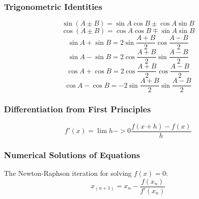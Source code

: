 \documentclass{book}
\begin{document}
            \subsubsection{Trigonometric Identities}
                \begin{equation} \label{sine_compound_angle_formula}
                    \sin(A\pm B)=\sin A\cos B\pm\cos A\sin B
                \end{equation}
                \begin{equation} \label{cosine_compound_angle_formula}
                    \cos(A\pm B)=\cos A\cos B\mp\sin A\sin B
                \end{equation}
                \begin{equation} \label{sine_addition_formula}
                    \sin A+\sin B=2\sin{\frac{A+B}{2}}\cos{\frac{A-B}{2}}
                \end{equation}
                \begin{equation} \label{sine_subtraction_formula}
                    \sin A-\sin B=2\cos{\frac{A+B}{2}}\sin{\frac{A-B}{2}}
                \end{equation}
                \begin{equation} \label{cosine_addition_formula}
                    \cos A+\cos B=2\cos{\frac{A+B}{2}}\cos{\frac{A-B}{2}}
                \end{equation}
                \begin{equation} \label{cosine_subtraction_formula}
                    \cos A-\cos B=-2\sin{\frac{A+B}{2}}\sin{\frac{A-B}{2}}
                \end{equation}

            \subsubsection{Differentiation from First Principles}
                \begin{equation}
                    f'(x)=\lim{h->0}{\frac{f(x+h)-f(x)}{h}}
                \end{equation}

            \subsubsection{Numerical Solutions of Equations}
                The Newton-Raphson iteration for solving $f(x)=0$:
                \begin{equation}
                    x_(n+1)=x_n-\frac{f(x_n)}{f'(x_n)}
                \end{equation}
\end{document}
